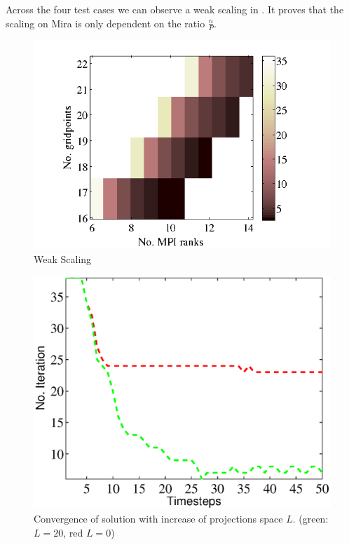 \documentclass{sig-alternate}
\begin{document}
Across the four test cases we can observe a weak scaling in
. It proves that the scaling on Mira is only dependent
on the ratio $\frac{n}{P}$. 
\begin{figure}
  \centering
  \includegraphics[width=\linewidth]{./figures/weak.png}
  \caption{Weak Scaling}
  \label{fig:weakscaling}
\end{figure}

\begin{figure}
  \centering
  \includegraphics[width=\linewidth]{./figures/projections.eps}
  \caption{Convergence of solution with increase of projections space $L$. (green: $L=20$, red $L=0$) }
  \label{fig:projections}
\end{figure}
\end{document}
